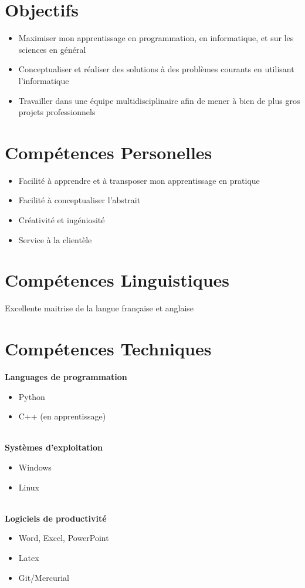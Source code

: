 \documentclass[11pt,a4paper,roman]{moderncv}        %
\begin{document}
\makecvtitle

\section{Objectifs}
\begin{itemize}
\item Maximiser mon apprentissage en programmation, en informatique, et sur les sciences en général
\item Conceptualiser et réaliser des solutions à des problèmes courants en utilisant l’informatique
\item Travailler dans une équipe multidisciplinaire afin de mener à bien de plus gros projets professionnels
\end{itemize}

\section{Compétences Personelles}
\begin{itemize}
\item Facilité à apprendre et à transposer mon apprentissage en pratique
\item Facilité à conceptualiser l’abstrait
\item Créativité et ingéniosité
\item Service à la clientèle
\end{itemize}

\section{Compétences Linguistiques}
Excellente maitrise de la langue française et anglaise

\section{Compétences Techniques}
{\bfseries Languages de programmation}
\begin{itemize}\item Python \item C++ (en apprentissage)\end{itemize}
\hfill\\
{\bfseries Systèmes d'exploitation}
\begin{itemize}\item Windows \item Linux \end{itemize}
\hfill\\
{\bfseries Logiciels de productivité}
\begin{itemize}\item Word, Excel, PowerPoint\item Latex \item Git/Mercurial\end{itemize}
\end{document}
